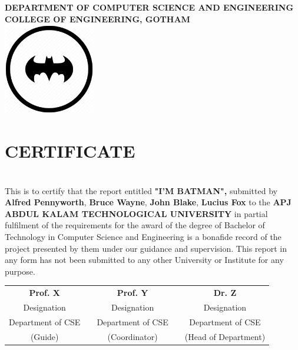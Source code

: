 \begin{center}

\bf{\Large {DEPARTMENT OF COMPUTER SCIENCE AND ENGINEERING}
}\\[0.2cm]
\normalsize
\textsc{\Large{COLLEGE OF ENGINEERING, GOTHAM}}\\[0.9cm]

    \includegraphics[width = 40mm]{Images/logo.png}

\end{center}
\section*{\centering CERTIFICATE}
\linespread{1}

\noindent \\This is to certify that the report entitled \textbf{"I'M BATMAN",} submitted by \textbf{Alfred Pennyworth}, \textbf{Bruce Wayne}, \textbf{John Blake}, \textbf{Lucius Fox} to the \textbf{APJ ABDUL KALAM TECHNOLOGICAL UNIVERSITY} in partial fulfilment of the requirements for the award of the degree of Bachelor of  Technology in Computer Science and Engineering is a bonafide record of the project presented by them under our guidance and supervision. This report in any form has not been submitted to any other University or Institute for any purpose.

\vspace{2cm}

\begin{center}
\begin{tabular}{c c c c c} 
\centering
 \textbf{Prof. X}     && \textbf{Prof. Y}    && \textbf{Dr. Z} \\ 
    Designation        &&  Designation      && Designation \\ 
    Department of CSE          &&  Department of CSE        && Department of CSE \\
    (Guide)            &&  (Coordinator)    && (Head of Department) \\


\end{tabular}
\end{center}
\thispagestyle{empty}
\newpage